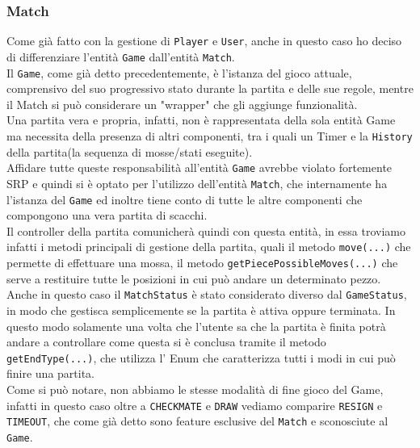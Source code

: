 \documentclass[a4paper,12pt]{report}
\begin{document}
\subsubsection{Match}
Come già fatto con la gestione di \texttt{Player} e \texttt{User}, anche in questo caso ho deciso di differenziare l'entità \texttt{Game} dall'entità \texttt{Match}.
\\
Il \texttt{Game}, come già detto precedentemente, è l'istanza del gioco attuale, comprensivo del suo progressivo stato durante la partita e delle sue regole, mentre il Match si può considerare un "wrapper" che gli aggiunge funzionalità.
\\
Una partita vera e propria, infatti, non è rappresentata della sola entità Game ma necessita della presenza di altri componenti, tra i quali un Timer e la \texttt{History} della partita(la sequenza di mosse/stati eseguite).
\\
Affidare tutte queste responsabilità all'entità \texttt{Game} avrebbe violato fortemente SRP e quindi si è optato per l'utilizzo dell'entità \texttt{Match}, che internamente ha l'istanza del \texttt{Game} ed inoltre tiene conto di tutte le altre componenti che compongono una vera partita di scacchi.
\\
Il controller della partita comunicherà quindi con questa entità, in essa troviamo infatti i metodi principali di gestione della partita, quali il metodo \texttt{move(...)} che permette di effettuare una mossa, il metodo \texttt{getPiecePossibleMoves(...)} che serve a restituire tutte le posizioni in cui può andare un determinato pezzo.
\\
Anche in questo caso il \texttt{MatchStatus} è stato considerato diverso dal \texttt{GameStatus}, in modo che gestisca semplicemente se la partita è attiva oppure terminata. In questo modo solamente una volta che l'utente sa che la partita è finita potrà andare a controllare come questa si è conclusa tramite il metodo \texttt{getEndType(...)}, che utilizza l' Enum che caratterizza tutti i modi in cui può finire una partita.
\\
Come si può notare, non abbiamo le stesse modalità di fine gioco del Game, infatti in questo caso oltre a \texttt{CHECKMATE} e \texttt{DRAW} vediamo comparire \texttt{RESIGN} e \texttt{TIMEOUT}, che come già detto sono feature esclusive del \texttt{Match} e sconosciute al \texttt{Game}.
%
\end{document}
